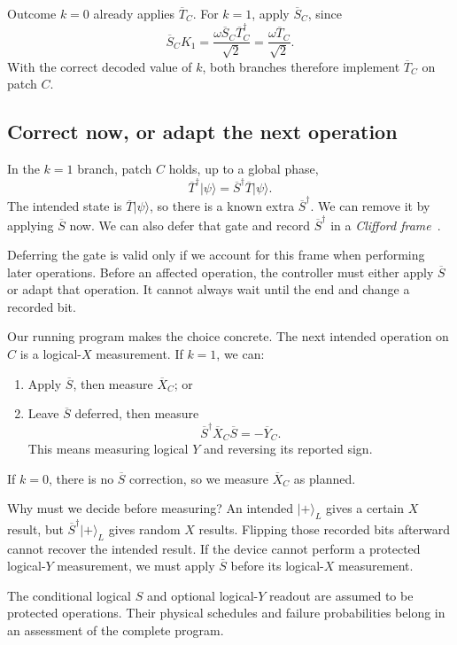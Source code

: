 \documentclass[11pt,a4paper]{article}
\newcommand{\ket}[1]{\lvert #1\rangle}
\newcommand{\XL}{\overline X}
\newcommand{\YL}{\overline Y}
\begin{document}
Outcome $k=0$ already applies $\overline T_C$. For $k=1$, apply
$\overline S_C$, since
\[
\overline S_C K_1
=\frac{\omega\overline S_C\overline T_C^\dagger}{\sqrt2}
=\frac{\omega\overline T_C}{\sqrt2}.
\]
With the correct decoded value of $k$, both branches therefore
implement $\overline T_C$ on patch $C$.

\subsection{Correct now, or adapt the next operation}

In the $k=1$ branch, patch $C$ holds, up to a global phase,
\[
\overline T^\dagger\ket\psi
=\overline S^\dagger\overline T\ket\psi.
\]
The intended state is $\overline T\ket\psi$, so there is a known
extra $\overline S^\dagger$. We can remove it by applying
$\overline S$ now. We can also defer that gate and record
$\overline S^\dagger$ in a \emph{Clifford frame}~\cite{slowframe}.

Deferring the gate is valid only if we account for this frame when
performing later operations. Before an affected operation, the
controller must either apply $\overline S$ or adapt that operation.
It cannot always wait until the end and change a recorded bit.

Our running program makes the choice concrete. The next intended
operation on $C$ is a logical-$X$ measurement. If $k=1$, we can:
\begin{enumerate}
\item Apply $\overline S$, then measure $\XL_C$; or
\item Leave $\overline S$ deferred, then measure
\[
\overline S^\dagger\XL_C\overline S=-\YL_C.
\]
This means measuring logical $Y$ and reversing its reported sign.
\end{enumerate}
If $k=0$, there is no $\overline S$ correction, so we measure
$\XL_C$ as planned.

Why must we decide before measuring? An intended $\ket+_L$ gives
a certain $X$ result, but $\overline S^\dagger\ket+_L$ gives random
$X$ results. Flipping those recorded bits afterward cannot recover
the intended result. If the device cannot perform a protected
logical-$Y$ measurement, we must apply $\overline S$ before its
logical-$X$ measurement.

The conditional logical $S$ and optional logical-$Y$ readout are assumed to be protected operations. Their physical schedules and failure probabilities belong in an assessment of the complete program.
\end{document}
